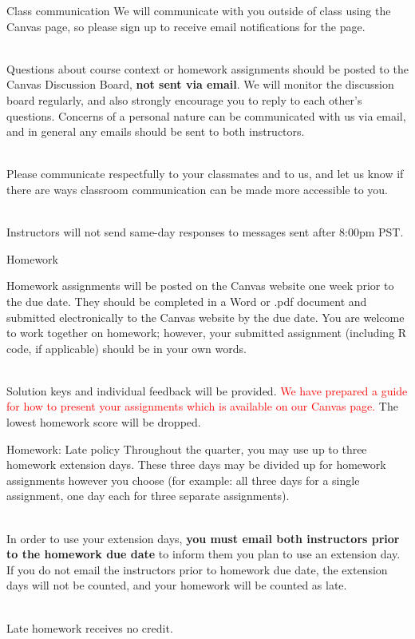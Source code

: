 \documentclass[10pt,t]{beamer}
\begin{document}
\begin{frame}{Class communication}
We will communicate with you outside of class using the Canvas page, so please sign up to receive email notifications for the page. \\~\

Questions about course context or homework assignments should be posted to the Canvas Discussion Board, \textbf{not sent via email}. We will monitor the discussion board regularly, and also strongly encourage you to reply to each other’s questions. Concerns of a personal nature can be communicated with us via email, and in general any emails should be sent to both instructors. \\~\

Please communicate respectfully to your classmates and to us, and let us know if there are ways classroom communication can be made more accessible to you. \\~\

Instructors will not send same-day responses to messages sent after 8:00pm PST.
\end{frame}

\begin{frame}{Homework}

Homework assignments will be posted on the Canvas website one week 
prior to the due date. They should be completed in a Word or .pdf document and 
submitted electronically to the Canvas website by the due date. You are welcome to work together on homework; however, your submitted assignment (including R code, if applicable) should be in your own words. \\~\

Solution keys and individual feedback will be provided. \textcolor{red}{We have prepared a guide for how to present your assignments which is available on our Canvas page.} The lowest homework score will be dropped.

\end{frame}

\begin{frame}{Homework: Late policy}
Throughout the quarter, you may use up to three homework 
extension days. These three days may be divided up for homework assignments however you choose (for example: all three days for a single assignment, one day each for three separate assignments). \\~\

In order to use your extension days, \textbf{you must email both instructors prior to the homework due date} to inform them you plan to use an extension day. If you do not email the instructors prior to homework due date, the extension days will not be counted, and your homework will be counted as late. \\~\

Late homework receives no credit.

\end{frame}
\end{document}
